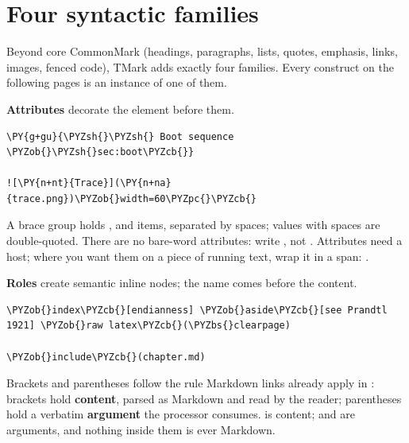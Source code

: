 \documentclass[a4paper,twoside]{article}
\begin{document}
\section{Four syntactic families}
Beyond core CommonMark (headings, paragraphs, lists, quotes, emphasis, links,
images, fenced code), TMark adds exactly four families. Every construct on the
following pages is an instance of one of them.

\textbf{Attributes} decorate the element before them.
\begin{tscode}[lang=md, engine=pygments]
\begin{Verbatim}[commandchars=\\\{\},breaklines, breakanywhere, commandchars=\\\{\}]
\PY{g+gu}{\PYZsh{}\PYZsh{} Boot sequence \PYZob{}\PYZsh{}sec:boot\PYZcb{}}

![\PY{n+nt}{Trace}](\PY{n+na}{trace.png})\PYZob{}width=60\PYZpc{}\PYZcb{}
\end{Verbatim}
\end{tscode}
A brace group holds ,  and  items, separated by spaces;
values with spaces are double-quoted. There are no bare-word attributes: write
, not . Attributes need a host; where you want
them on a piece of running text, wrap it in a span: .

\textbf{Roles} create semantic inline nodes; the name comes before the content.
\begin{tscode}[lang=md, engine=pygments]
\begin{Verbatim}[commandchars=\\\{\},breaklines, breakanywhere, commandchars=\\\{\}]
\PYZob{}index\PYZcb{}[endianness] \PYZob{}aside\PYZcb{}[see Prandtl 1921] \PYZob{}raw latex\PYZcb{}(\PYZbs{}clearpage)

\PYZob{}include\PYZcb{}(chapter.md)
\end{Verbatim}
\end{tscode}
Brackets and parentheses follow the rule Markdown links already apply in
: brackets hold \textbf{content}, parsed as Markdown and read by
the reader; parentheses hold a verbatim \textbf{argument} the processor consumes.
 is content;  and
 are arguments, and nothing inside them is ever
Markdown.
\end{document}

